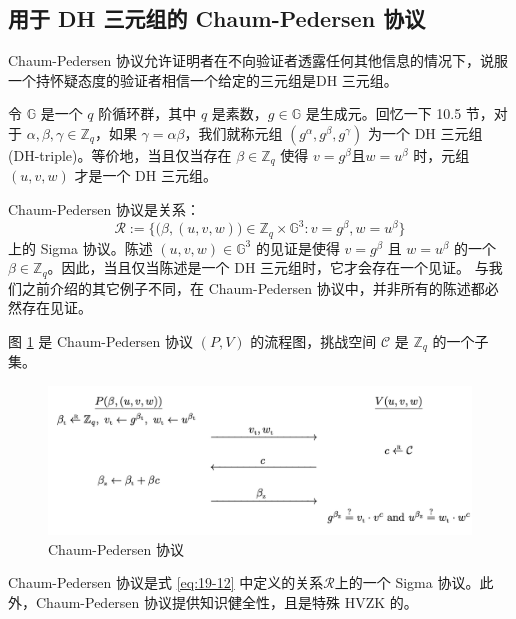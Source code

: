 \subsection{用于 DH 三元组的 Chaum-Pedersen 协议}\label{subsec:19-5-2}

Chaum-Pedersen 协议允许证明者在不向验证者透露任何其他信息的情况下，说服一个持怀疑态度的验证者相信一个给定的三元组是DH 三元组。

令 $\mathbb{G}$ 是一个 $q$ 阶循环群，其中 $q$ 是素数，$g\in\mathbb{G}$ 是生成元。回忆一下 10.5 节，对于 $\alpha,\beta,\gamma\in\mathbb{Z}_q$，如果 $\gamma=\alpha\beta$，我们就称元组 $(g^\alpha,g^\beta,g^\gamma)$ 为一个 DH 三元组 (DH-triple)。等价地，当且仅当存在 $\beta\in\mathbb{Z}_q$ 使得 $v=g^\beta$且$w=u^\beta$ 时，元组 $(u,v,w)$ 才是一个 DH 三元组。

Chaum-Pedersen 协议是关系：
\begin{equation}\label{eq:19-12}
\mathcal{R}:=\bigg\lbrace
\big(\beta, (u,v,w)\big)\in\mathbb{Z}_q\times\mathbb{G}^3:v=g^\beta, w=u^\beta
\bigg\rbrace
\end{equation}
上的 Sigma 协议。陈述 $(u,v,w)\in\mathbb{G}^3$ 的见证是使得 $v=g^\beta$ 且 $w=u^\beta$ 的一个 $\beta\in\mathbb{Z}_q$。因此，当且仅当陈述是一个 DH 三元组时，它才会存在一个见证。 与我们之前介绍的其它例子不同，在 Chaum-Pedersen 协议中，并非所有的陈述都必然存在见证。 

图 \ref{fig:19-7} 是 Chaum-Pedersen 协议 $(P,V)$ 的流程图，挑战空间 $\mathcal{C}$ 是 $\mathbb{Z}_q$ 的一个子集。

\begin{figure}
  \centering
  \includegraphics[width=0.75\linewidth]{figures/chapter19/fig7.png}
  \caption{Chaum-Pedersen 协议}
  \label{fig:19-7}
\end{figure}

\begin{theorem}
Chaum-Pedersen 协议是式 \ref{eq:19-12} 中定义的关系$\mathcal R$上的一个 Sigma 协议。此外，Chaum-Pedersen 协议提供知识健全性，且是特殊 HVZK 的。
\end{theorem}


